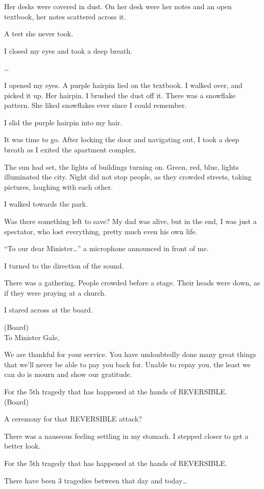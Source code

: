 Her desks were covered in dust. On her desk were her notes and an open textbook, her notes scattered across it. 

A test she never took.

I closed my eyes and took a deep breath.

…

I opened my eyes. A purple hairpin lied on the textbook. I walked over, and picked it up. Her hairpin. I brushed the dust off it. There was a snowflake pattern. She liked snowflakes ever since I could remember. 

I slid the purple hairpin into my hair. 

It was time to go. After locking the door and navigating out, I took a deep breath as I exited the apartment complex.

The sun had set, the lights of buildings turning on. Green, red, blue, lights illuminated the city. Night did not stop people, as they crowded streets, taking pictures, laughing with each other.

I walked towards the park.

Was there something left to save? My dad was alive, but in the end, I was just a spectator, who lost everything, pretty much even his own life. 

“To our dear Minister…” a microphone announced in front of me.

I turned to the direction of the sound.

There was a gathering. People crowded before a stage. Their heads were down, as if they were praying at a church. 

I stared across at the board. 

(Board) \\
To Minister Gale,

We are thankful for your service. You have undoubtedly done many great things that we’ll never be able to pay you back for. Unable to repay you, the least we can do is mourn and show our gratitude.

For the 5th tragedy that has happened at the hands of REVERSIBLE.\\
(Board)

A ceremony for that REVERSIBLE attack?

There was a nauseous feeling settling in my stomach. I stepped closer to get a better look. 

For the 5th tragedy that has happened at the hands of REVERSIBLE.

There have been 3 tragedies between that day and today…

